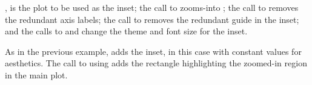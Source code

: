 \documentclass[krantz2]{krantz}\usepackage{knitr}
\begin{document}
, is the plot to be used as the inset; the call to  zooms-into ; the call to  removes the redundant axis labels; the call to  removes the redundant guide in the inset; and the calls to  and  change the theme and font size for the inset.

\begin{knitrout}\footnotesize
{}\color{fgcolor}\begin{kframe}
\begin{alltt}
 \hlkwb{<-}  \hlopt{+}
  \hlstd{(} \hlstd{=} \hlstd{(}\hlstd{,} \hlstd{),}  \hlstd{=} \hlstd{(}\hlstd{,} \hlstd{))} \hlopt{+}
  \hlstd{(} \hlstd{=} \hlstd{,}  \hlstd{=} \hlstd{)} \hlopt{+}
  \hlstd{(} \hlstd{=} \hlstd{)} \hlopt{+}
  \hlstd{(}\hlstd{)} \hlopt{+} \hlstd{(} \hlstd{=} \hlstd{)}
\end{alltt}
\end{kframe}
\end{knitrout}

As in the previous example,  adds the inset, in this case with constant values for aesthetics. The call to  using  adds the rectangle highlighting the zoomed-in region in the main plot.\label{par:plot:inset:zoom}
\end{document}
